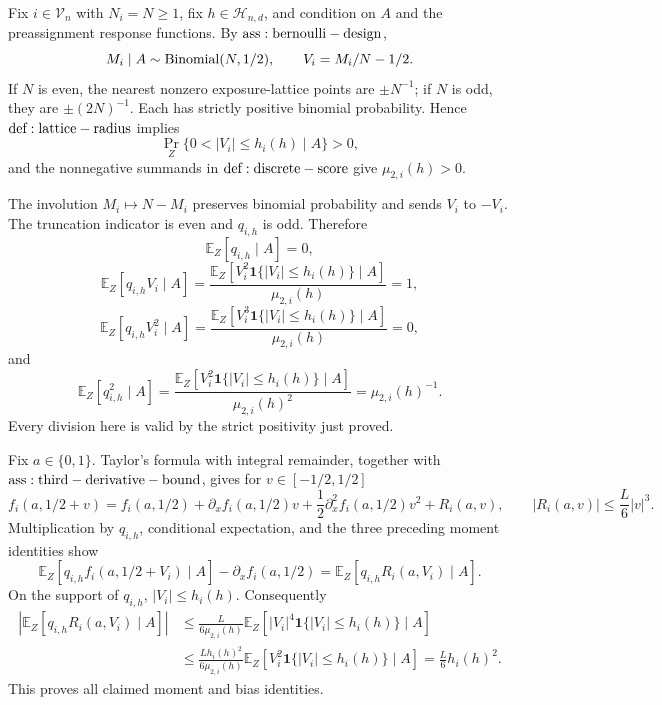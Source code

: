 Fix \(i\in\mathcal V_n\) with \(N_i=N\geq1\), fix \(h\in\mathcal H_{n,d}\), and condition on \(A\) and the preassignment response functions.  By \({\rm ass:bernoulli-design}\),
\[
 M_i\mid A\sim {\rm Binomial}(N,1/2),\qquad V_i=M_i/N-1/2.
\]
If \(N\) is even, the nearest nonzero exposure-lattice points are \(\pm N^{-1}\); if \(N\) is odd, they are \(\pm(2N)^{-1}\).  Each has strictly positive binomial probability.  Hence \({\rm def:lattice-radius}\) implies
\[
 \Pr_Z\{0<|V_i|\leq h_i(h)\mid A\}>0,
\]
and the nonnegative summands in \({\rm def:discrete-score}\) give \(\mu_{2,i}(h)>0\).

The involution \(M_i\mapsto N-M_i\) preserves binomial probability and sends \(V_i\) to \(-V_i\).  The truncation indicator is even and \(q_{i,h}\) is odd.  Therefore
\[
 \mathbb E_Z[q_{i,h}\mid A]=0,
\]
\[
 \mathbb E_Z[q_{i,h}V_i\mid A]
 =\frac{\mathbb E_Z[V_i^2\mathbf1\{|V_i|\leq h_i(h)\}\mid A]}{\mu_{2,i}(h)}=1,
\]
\[
 \mathbb E_Z[q_{i,h}V_i^2\mid A]
 =\frac{\mathbb E_Z[V_i^3\mathbf1\{|V_i|\leq h_i(h)\}\mid A]}{\mu_{2,i}(h)}=0,
\]
and
\[
 \mathbb E_Z[q_{i,h}^2\mid A]
 =\frac{\mathbb E_Z[V_i^2\mathbf1\{|V_i|\leq h_i(h)\}\mid A]}{\mu_{2,i}(h)^2}
 =\mu_{2,i}(h)^{-1}.
\]
Every division here is valid by the strict positivity just proved.

Fix \(a\in\{0,1\}\).  Taylor's formula with integral remainder, together with \({\rm ass:third-derivative-bound}\), gives for \(v\in[-1/2,1/2]\)
\[
 f_i(a,1/2+v)=f_i(a,1/2)+\partial_xf_i(a,1/2)v
 +\frac12\partial_x^2f_i(a,1/2)v^2+R_i(a,v),
 \qquad |R_i(a,v)|\leq \frac L6|v|^3.
\]
Multiplication by \(q_{i,h}\), conditional expectation, and the three preceding moment identities show
\[
 \mathbb E_Z[q_{i,h}f_i(a,1/2+V_i)\mid A]-\partial_xf_i(a,1/2)
 =\mathbb E_Z[q_{i,h}R_i(a,V_i)\mid A].
\]
On the support of \(q_{i,h}\), \(|V_i|\leq h_i(h)\).  Consequently
\[
\begin{aligned}
 \left|\mathbb E_Z[q_{i,h}R_i(a,V_i)\mid A]\right|
 &\leq \frac{L}{6\mu_{2,i}(h)}
 \mathbb E_Z[|V_i|^4\mathbf1\{|V_i|\leq h_i(h)\}\mid A]\\
 &\leq \frac{Lh_i(h)^2}{6\mu_{2,i}(h)}
 \mathbb E_Z[V_i^2\mathbf1\{|V_i|\leq h_i(h)\}\mid A]
 =\frac L6h_i(h)^2.
\end{aligned}
\]
This proves all claimed moment and bias identities.